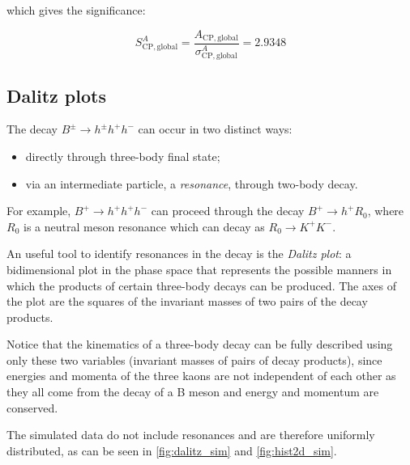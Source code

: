 which gives the significance:

\begin{equation}
    S_{\mathrm{CP, global}}^{A} = \frac{A_{\mathrm{CP, global}}}{\sigma_{\mathrm{CP, global}}^{A}} = 2.9348
\end{equation}


\subsection{Dalitz plots}

The decay $B^{\pm} \rightarrow h^{\pm} h^{+} h^{-}$ can occur in two distinct ways:

\begin{itemize}
    \item directly through three-body final state;
    \item via an intermediate particle, a \emph{resonance}, through two-body decay.
\end{itemize}

For example, $B^{+} \rightarrow h^{+} h^{+} h^{-}$ can proceed through the decay $B^{+} \rightarrow h^{+} R_{0}$, where $R_{0}$ is a neutral meson resonance which can decay as $R_{0} \rightarrow K^{+} K^{-}$.

An useful tool to identify resonances in the decay is the \emph{Dalitz plot}: a bidimensional plot in the phase space that represents the possible manners in which the products of certain three-body decays can be produced. The axes of the plot are the squares of the invariant masses of two pairs of the decay products.

Notice that the kinematics of a three-body decay can be fully described using only these two variables (invariant masses of pairs of decay products), since energies and momenta of the three kaons are not independent of each other as they all come from the decay of a B meson and energy and momentum are conserved.

The simulated data do not include resonances and are therefore uniformly distributed, as can be seen in \autoref{fig:dalitz_sim} and \autoref{fig:hist2d_sim}.

